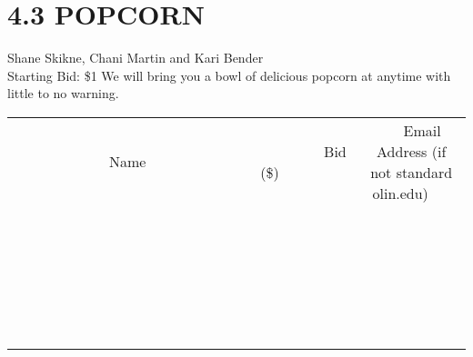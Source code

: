\documentclass[11pt]{article}
\begin{document}
\section*{4.3 POPCORN}
Shane Skikne, Chani  Martin and Kari Bender
\\
Starting Bid: \$1
\newline
We will bring you a bowl of delicious popcorn at anytime with little to no warning.
\\[6ex]
\begin{tabular}{c c c}
~~~~~~~~~~~~~Name~~~~~~~~~~~~~ & ~~~~~~~~~Bid (\$)~~~~~~~~~  & ~~~Email Address (if not standard olin.edu)~~~\\
 & & \\
\hline
 & & \\
\hline
 & & \\
\hline
 & & \\
\hline
 & & \\
\hline
 & & \\
\hline
 & & \\
\hline
 & & \\
\hline
 & & \\
\hline
 & & \\
\hline
 & & \\
\hline
 & & \\
\hline
 & & \\
\hline
 & & \\
\hline
 & & \\
\hline
 & & \\
\hline
 & & \\
\hline
 & & \\
\hline
 & & \\
\hline
 & & \\
\hline
 & & \\
\hline
 & & \\
\hline
 & & \\
\hline
 & & \\
\hline
 & & \\
\hline
 & & \\
\hline
\end{tabular}
\newpage
\end{document}
